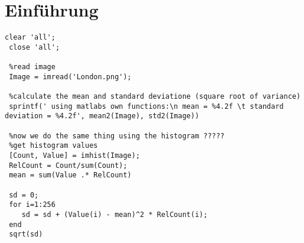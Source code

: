 



\chapter{Einführung}

\lstset{language=Matlab}
 \begin{lstlisting}[caption=Sample Code]
 clear 'all';
 close 'all';
 
 %read image
 Image = imread('London.png');
 
 %calculate the mean and standard deviatione (square root of variance)
 sprintf(' using matlabs own functions:\n mean = %4.2f \t standard deviation = %4.2f', mean2(Image), std2(Image))
 
 %now we do the same thing using the histogram ?????
 %get histogram values
 [Count, Value] = imhist(Image);
 RelCount = Count/sum(Count);
 mean = sum(Value .* RelCount)
 
 sd = 0;
 for i=1:256
    sd = sd + (Value(i) - mean)^2 * RelCount(i);
 end
 sqrt(sd)
 \end{lstlisting}

\lstset{language=C}

